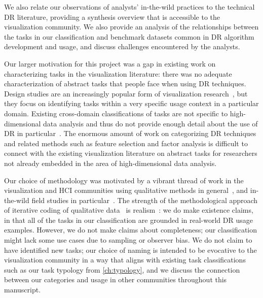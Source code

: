 We also relate our observations of analysts' in-the-wild practices to the technical \ac{DR} literature, providing a synthesis overview that is accessible to the visualization community. 
We also provide an analysis of the relationships between the tasks in our classification and benchmark datasets common in \ac{DR} algorithm development and usage, and discuss challenges encountered by the analysts.

Our larger motivation for this project was a gap in existing work on characterizing tasks in the visualization literature: there was no adequate characterization of abstract tasks that people face when using \ac{DR} techniques. 
Design studies are an increasingly popular form of visualization research~\cite{Sedlmair2012}, but they focus on identifying tasks within a very specific usage context in a particular domain. 
Existing cross-domain classifications of tasks are not specific to high-dimensional data analysis and thus do not provide enough detail about the use of \ac{DR} in particular~\cite{Amar2004,Yi2007}. 
The enormous amount of work on categorizing \ac{DR} techniques and related methods such as feature selection and factor analysis is difficult to connect with the existing visualization literature on abstract tasks for researchers not already embedded in the area of high-dimensional data analysis.

Our choice of methodology was motivated by a vibrant thread of work in the visualization and \ac{HCI} communities using qualitative methods in general~\cite{Boyandin2012,Carpendale2008,Isenberg2008,Sedlmair2012a,Tory2008}, and in-the-wild field studies in particular~\cite{Kandel2012,Kang2011}. 
The strength of the methodological approach of iterative coding of qualitative data~\cite{Charmaz2006} is realism~\cite{McGrath1995}: we do make existence claims, in that all of the tasks in our classification are grounded in real-world \ac{DR} usage examples. 
However, we do not make claims about completeness; our classification might lack some use cases due to sampling or observer bias. 
We do not claim to have identified new tasks; our choice of naming is intended to be evocative to the visualization community in a way that aligns with existing task classifications such as our task typology from \autoref{ch:typology}, and we discuss the connection between our categories and usage in other communities throughout this manuscript. 

